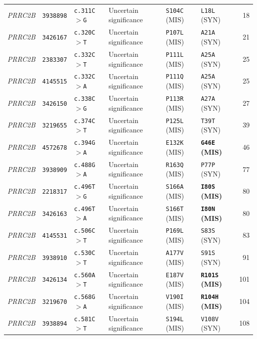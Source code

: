 \documentclass[10pt,letterpaper]{article}
\newcommand{\gene}[1]{\textit{#1}}
\begin{document}
{\begin{longtable}{@{}llllllr@{}}
\gene{PRRC2B} & \texttt{3938898} & \texttt{c.311C$>$G} & Uncertain significance & \texttt{S104C} (MIS) & \texttt{L18L} (SYN) & 18 \\
\gene{PRRC2B} & \texttt{3426167} & \texttt{c.320C$>$T} & Uncertain significance & \texttt{P107L} (MIS) & \texttt{A21A} (SYN) & 21 \\
\gene{PRRC2B} & \texttt{2383307} & \texttt{c.332C$>$T} & Uncertain significance & \texttt{P111L} (MIS) & \texttt{A25A} (SYN) & 25 \\
\gene{PRRC2B} & \texttt{4145515} & \texttt{c.332C$>$A} & Uncertain significance & \texttt{P111Q} (MIS) & \texttt{A25A} (SYN) & 25 \\
\gene{PRRC2B} & \texttt{3426150} & \texttt{c.338C$>$G} & Uncertain significance & \texttt{P113R} (MIS) & \texttt{A27A} (SYN) & 27 \\
\gene{PRRC2B} & \texttt{3219655} & \texttt{c.374C$>$T} & Uncertain significance & \texttt{P125L} (MIS) & \texttt{T39T} (SYN) & 39 \\
\gene{PRRC2B} & \texttt{4572678} & \texttt{c.394G$>$A} & Uncertain significance & \texttt{E132K} (MIS) & \textbf{\texttt{G46E} (MIS)} & 46 \\
\gene{PRRC2B} & \texttt{3938909} & \texttt{c.488G$>$A} & Uncertain significance & \texttt{R163Q} (MIS) & \texttt{P77P} (SYN) & 77 \\
\gene{PRRC2B} & \texttt{2218317} & \texttt{c.496T$>$G} & Uncertain significance & \texttt{S166A} (MIS) & \textbf{\texttt{I80S} (MIS)} & 80 \\
\gene{PRRC2B} & \texttt{3426163} & \texttt{c.496T$>$A} & Uncertain significance & \texttt{S166T} (MIS) & \textbf{\texttt{I80N} (MIS)} & 80 \\
\gene{PRRC2B} & \texttt{4145531} & \texttt{c.506C$>$T} & Uncertain significance & \texttt{P169L} (MIS) & \texttt{S83S} (SYN) & 83 \\
\gene{PRRC2B} & \texttt{3938910} & \texttt{c.530C$>$T} & Uncertain significance & \texttt{A177V} (MIS) & \texttt{S91S} (SYN) & 91 \\
\gene{PRRC2B} & \texttt{3426134} & \texttt{c.560A$>$T} & Uncertain significance & \texttt{E187V} (MIS) & \textbf{\texttt{R101S} (MIS)} & 101 \\
\gene{PRRC2B} & \texttt{3219670} & \texttt{c.568G$>$A} & Uncertain significance & \texttt{V190I} (MIS) & \textbf{\texttt{R104H} (MIS)} & 104 \\
\gene{PRRC2B} & \texttt{3938894} & \texttt{c.581C$>$T} & Uncertain significance & \texttt{S194L} (MIS) & \texttt{V108V} (SYN) & 108 \\

\end{longtable}}
\end{document}
